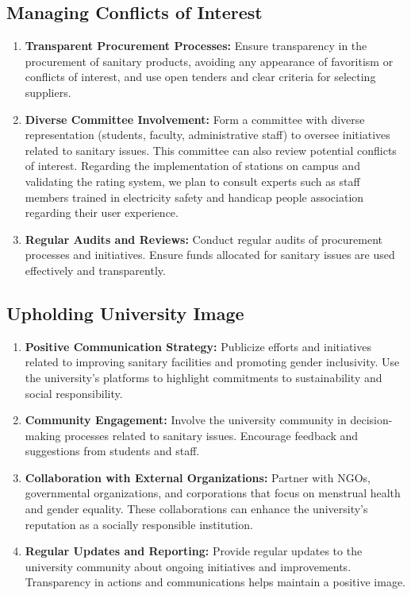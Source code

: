 \subsection{Managing Conflicts of Interest}
\begin{enumerate}
    \item \textbf{Transparent Procurement Processes:} Ensure transparency in the procurement of sanitary products, avoiding any appearance of favoritism or conflicts of interest, and use open tenders and clear criteria for selecting suppliers.
    \item \textbf{Diverse Committee Involvement:} Form a committee with diverse representation (students, faculty, administrative staff) to oversee initiatives related to sanitary issues. This committee can also review potential conflicts of interest. Regarding the implementation of stations on campus and validating the rating system, we plan to consult experts such as staff members trained in electricity safety and handicap people association regarding their user experience.
    \item \textbf{Regular Audits and Reviews:} Conduct regular audits of procurement processes and initiatives. Ensure funds allocated for sanitary issues are used effectively and transparently.
\end{enumerate}

\subsection{Upholding University Image}
\begin{enumerate}
    \item \textbf{Positive Communication Strategy:} Publicize efforts and initiatives related to improving sanitary facilities and promoting gender inclusivity. Use the university's platforms to highlight commitments to sustainability and social responsibility.
    \item \textbf{Community Engagement:} Involve the university community in decision-making processes related to sanitary issues. Encourage feedback and suggestions from students and staff.
    \item \textbf{Collaboration with External Organizations:} Partner with NGOs, governmental organizations, and corporations that focus on menstrual health and gender equality. These collaborations can enhance the university's reputation as a socially responsible institution.
    \item \textbf{Regular Updates and Reporting:} Provide regular updates to the university community about ongoing initiatives and improvements. Transparency in actions and communications helps maintain a positive image.
\end{enumerate}

